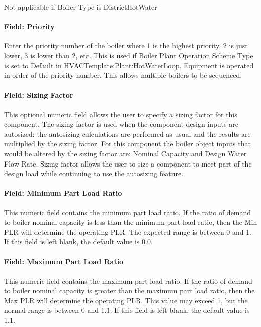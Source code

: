Not applicable if Boiler Type is DistrictHotWater

\paragraph{Field: Priority}\label{field-priority-4}

Enter the priority number of the boiler where 1 is the highest priority, 2 is just lower, 3 is lower than 2, etc. This is used if Boiler Plant Operation Scheme Type is set to Default in \hyperref[hvactemplateplanthotwaterloop]{HVACTemplate:Plant:HotWaterLoop}. Equipment is operated in order of the priority number. This allows multiple boilers to be sequenced.

\paragraph{Field: Sizing Factor}\label{field-sizing-factor-1-000}

This optional numeric field allows the user to specify a sizing factor for this component. The sizing factor is used when the component design inputs are autosized: the autosizing calculations are performed as usual and the results are multiplied by the sizing factor. For this component the boiler object inputs that would be altered by the sizing factor are: Nominal Capacity and Design Water Flow Rate. Sizing factor allows the user to size a component to meet part of the design load while continuing to use the autosizing feature.

\paragraph{Field: Minimum Part Load Ratio}\label{field-minimum-part-load-ratio-1-000}

This numeric field contains the minimum part load ratio. If the ratio of demand to boiler nominal capacity is less than the minimum part load ratio, then the Min PLR will determine the operating PLR. The expected range is between 0 and 1. If this field is left blank, the default value is 0.0.

\paragraph{Field: Maximum Part Load Ratio}\label{field-maximum-part-load-ratio-1-000}

This numeric field contains the maximum part load ratio. If the ratio of demand to boiler nominal capacity is greater than the maximum part load ratio, then the Max PLR will determine the operating PLR. This value may exceed 1, but the normal range is between 0 and 1.1. If this field is left blank, the default value is 1.1.

